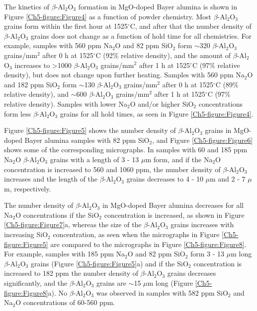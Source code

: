 The kinetics of $\beta$-Al$_{2}$O$_{3}$ formation in MgO-doped Bayer alumina is shown in Figure \ref{Ch5-figure:Figure4} as a function of powder chemistry. Most $\beta$-Al$_{2}$O$_{3}$ grains form within the first hour at 1525$^{\circ}$C, and after that the number density of $\beta$-Al$_{2}$O$_{3}$ grains does not change as a function of hold time for all chemistries. For example, samples with 560 ppm Na$_{2}$O and 82 ppm SiO$_{2}$ form $\sim$320 $\beta$-Al$_{2}$O$_{3}$ grains/mm$^{2}$ after 0 h at 1525$^{\circ}$C (92\% relative density), and the amount of $\beta$-Al$_{2}$O$_{3}$ increases to >1000 $\beta$-Al$_{2}$O$_{3}$ grains/mm$^{2}$ after 1 h at 1525$^{\circ}$C (97\% relative density), but does not change upon further heating. Samples with 560 ppm Na$_{2}$O and 182 ppm SiO$_{2}$ form $\sim$130 $\beta$-Al$_{2}$O$_{3}$ grains/mm$^{2}$ after 0 h at 1525$^{\circ}$C (89\% relative density), and $\sim$600 $\beta$-Al$_{2}$O$_{3}$ grains/mm$^{2}$ after 1 h at 1525$^{\circ}$C (97\% relative density). Samples with lower Na$_{2}$O and/or higher SiO$_{2}$ concentrations form less $\beta$-Al$_{2}$O$_{3}$ grains for all hold times, as seen in Figure \ref{Ch5-figure:Figure4}.

Figure \ref{Ch5-figure:Figure5} shows the number density of $\beta$-Al$_{2}$O$_{3}$ grains in MgO-doped Bayer alumina samples with 82 ppm SiO$_{2}$, and Figure \ref{Ch5-figure:Figure6} shows some of the corresponding micrographs. In samples with 60 and 185 ppm Na$_{2}$O $\beta$-Al$_{2}$O$_{3}$ grains with a length of 3 - 13 $\mu$m form, and if the Na$_{2}$O concentration is increased to 560 and 1060 ppm, the number density of $\beta$-Al$_{2}$O$_{3}$ increases and the length of the $\beta$-Al$_{2}$O$_{3}$ grains decreases to 4 - 10 $\mu$m and 2 - 7 $\mu$m, respectively.

The number density of $\beta$-Al$_{2}$O$_{3}$ in MgO-doped Bayer alumina decreases for all Na$_{2}$O concentrations if the SiO$_{2}$ concentration is increased, as shown in Figure \ref{Ch5-figure:Figure7}a, whereas the size of the $\beta$-Al$_{2}$O$_{3}$ grains increases with increasing SiO$_{2}$ concentration, as seen when the micrographs in Figure \ref{Ch5-figure:Figure5} are compared to the micrographs in Figure \ref{Ch5-figure:Figure8}. For example, samples with 185 ppm Na$_{2}$O and 82 ppm SiO$_{2}$ form 3 - 13 $\mu$m long $\beta$-Al$_{2}$O$_{3}$ grains (Figure \ref{Ch5-figure:Figure5}a) and if the SiO$_{2}$ concentration is increased to 182 ppm the number density of $\beta$-Al$_{2}$O$_{3}$ grains decreases significantly, and the $\beta$-Al$_{2}$O$_{3}$ grains are $\sim$15 $\mu$m long (Figure \ref{Ch5-figure:Figure8}a). No $\beta$-Al$_{2}$O$_{3}$ was observed in samples with 582 ppm SiO$_{2}$ and Na$_{2}$O concentrations of 60-560 ppm.

